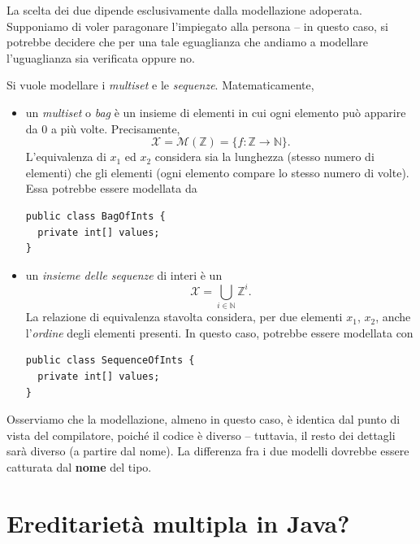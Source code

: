 \documentclass[\fontsizeclass,twocolumn]{\classname}
\theoremstyle{definition}
\theoremstyle{definition}
\begin{document}
La scelta dei due dipende esclusivamente dalla modellazione adoperata.
Supponiamo di voler paragonare l'impiegato alla persona \--- in questo caso, si
potrebbe decidere che per una tale eguaglianza che andiamo a modellare
l'uguaglianza sia verificata oppure no.

Si vuole modellare i \emph{multiset} e le \emph{sequenze}. Matematicamente,

\begin{itemize}
    \item un \emph{multiset} o \emph{bag} è un insieme di elementi in cui ogni elemento può
        apparire da $0$ a più volte. Precisamente, $$\mathcal X = \mathcal M
        (\mathbb{Z}) = \{f:\mathbb{Z} \rightarrow \mathbb{N}\}.$$ L'equivalenza
        di $x_1$ ed $x_2$ considera sia la lunghezza (stesso numero di
        elementi) che gli elementi (ogni elemento compare lo stesso numero di
        volte). Essa potrebbe essere modellata da 
        

\begin{minipage}[c]{1\textwidth}\begin{lstlisting}
public class BagOfInts {
  private int[] values;
}
\end{lstlisting}\end{minipage}

    \item un \emph{insieme delle sequenze} di interi è un $$\mathcal X = \bigcup
        _{i\in\mathbb{N}}\mathbb{Z}^i.$$ La relazione di equivalenza stavolta
        considera, per due elementi $x_1$, $x_2$, anche l'\emph{ordine} degli
        elementi presenti. In questo caso, potrebbe essere modellata con

\begin{minipage}[c]{1\textwidth}\begin{lstlisting}
public class SequenceOfInts {
  private int[] values;
}
\end{lstlisting}\end{minipage}

\end{itemize}

Osserviamo che la modellazione, almeno in questo caso, è identica dal punto di
vista del compilatore, poiché il codice è diverso \--- tuttavia, il resto dei
dettagli sarà diverso (a partire dal nome). La differenza fra i due modelli
dovrebbe essere catturata dal \textbf{nome} del tipo.

\section{Ereditarietà multipla in Java?}
\end{document}
